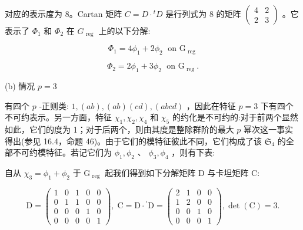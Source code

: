 \documentclass[10pt]{article}
\begin{document}
对应的表示度为 8。Cartan 矩阵 \(C = D \cdot  {}^{t}D\) 是行列式为 8 的矩阵 \(\left( \begin{array}{ll} 4 & 2 \\  2 & 3 \end{array}\right)\) 。它表示了 \({\Phi }_{1}\) 和 \({\Phi }_{2}\) 在 \({G}_{\text{ reg }}\) 上的以下分解:

\[
{\Phi }_{1} = 4{\phi }_{1} + 2{\phi }_{2}\;\text{ on }{\mathrm{G}}_{\text{ reg }}
\]

\[
{\Phi }_{2} = 2{\phi }_{1} + 3{\phi }_{2}\;\text{ on }{\mathrm{G}}_{\text{ reg }}.
\]

(b) 情况 \(p = 3\)

有四个 \(p\) -正则类: \(1,\left( {ab}\right) ,\left( {ab}\right) \left( {cd}\right) ,\left( {abcd}\right)\) ，因此在特征 \(p = 3\) 下有四个不可约表示。另一方面，特征 \({\chi }_{1},{\chi }_{2},{\chi }_{4}\) 和 \({\chi }_{5}\) 的约化是不可约的:对于前两个显然如此，它们的度为 1；对于后两个，则由其度是整除群阶的最大 \(p\) 幂次这一事实得出(参见 16.4，命题 46)。由于它们的模特征彼此不同，它们构成了该 \({\mathfrak{S}}_{4}\) 的全部不可约模特征。若记它们为 \({\phi }_{1},{\phi }_{2}\) 、 \({\phi }_{3},{\phi }_{4}\) ，则有下表:

\begin{center}
\end{center}

自从 \({\chi }_{3} = {\phi }_{1} + {\phi }_{2}\) 于 \({\mathrm{G}}_{\text{ reg }}\) 起我们得到如下分解矩阵 D 与卡坦矩阵 C:

\[
\mathrm{D} = \left( \begin{array}{lllll} 1 & 0 & 1 & 0 & 0 \\  0 & 1 & 1 & 0 & 0 \\  0 & 0 & 0 & 1 & 0 \\  0 & 0 & 0 & 0 & 1 \end{array}\right) ,\;\mathrm{C} = \mathrm{D} \cdot  {}^{\prime }\mathrm{D} = \left( \begin{array}{llll} 2 & 1 & 0 & 0 \\  1 & 2 & 0 & 0 \\  0 & 0 & 1 & 0 \\  0 & 0 & 0 & 1 \end{array}\right) ,\det \left( \mathrm{C}\right)  = 3.
\]
\end{document}
